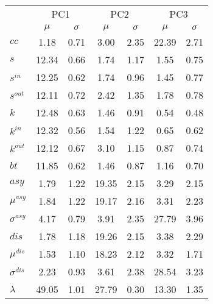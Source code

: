 \begin{center}
\begin{tabular}{| l || c | c | c | c | c | c |}\cline{2-7}
\multicolumn{1}{c|}{} & \multicolumn{2}{c|}{PC1}          & \multicolumn{2}{c|}{PC2} & \multicolumn{2}{c|}{PC3}  \\\cline{2-7}\multicolumn{1}{c|}{} & $\mu$            & $\sigma$ & $\mu$         & $\sigma$ & $\mu$ & $\sigma$  \\\hline
$cc$ & 1.18  & 0.71  & 3.00  & 2.35  & 22.39  & 2.71 \\\hline
$s$ & 12.34  & 0.66  & 1.74  & 1.17  & 1.55  & 0.75 \\
$s^{in}$ & 12.25  & 0.62  & 1.74  & 0.96  & 1.45  & 0.77 \\
$s^{out}$ & 12.11  & 0.72  & 2.42  & 1.35  & 1.78  & 0.78 \\
$k$ & 12.48  & 0.63  & 1.46  & 0.91  & 0.54  & 0.48 \\
$k^{in}$ & 12.32  & 0.56  & 1.54  & 1.22  & 0.65  & 0.62 \\
$k^{out}$ & 12.12  & 0.67  & 3.10  & 1.15  & 0.87  & 0.74 \\
$bt$ & 11.85  & 0.62  & 1.46  & 0.87  & 1.16  & 0.70 \\\hline
$asy$ & 1.79  & 1.22  & 19.35  & 2.15  & 3.29  & 2.15 \\
$\mu^{asy}$ & 1.84  & 1.22  & 19.17  & 2.16  & 3.31  & 2.23 \\
$\sigma^{asy}$ & 4.17  & 0.79  & 3.91  & 2.35  & 27.79  & 3.96 \\
$dis$ & 1.78  & 1.18  & 19.26  & 2.15  & 3.38  & 2.29 \\
$\mu^{dis}$ & 1.53  & 1.10  & 18.23  & 2.12  & 3.32  & 1.71 \\
$\sigma^{dis}$ & 2.23  & 0.93  & 3.61  & 2.38  & 28.54  & 3.23 \\\hline\hline
$\lambda$ & 49.05  & 1.01  & 27.79  & 0.30  & 13.30  & 1.35 \\
\hline\end{tabular}
\end{center}
